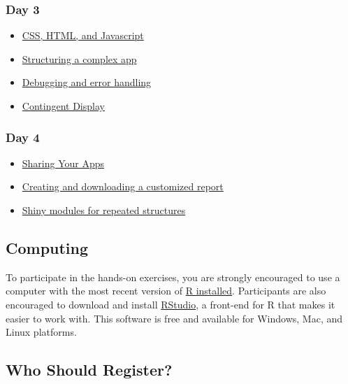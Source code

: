\documentclass[
  oneside]{book}
\providecommand{\tightlist}{%
  \setlength{\itemsep}{0pt}\setlength{\parskip}{0pt}}
\begin{document}
\hypertarget{day-3}{%
\subsubsection*{Day 3}\label{day-3}}

\begin{itemize}
\tightlist
\item
  \protect\hyperlink{web}{CSS, HTML, and Javascript}
\item
  \protect\hyperlink{structure}{Structuring a complex app}
\item
  \protect\hyperlink{debugging}{Debugging and error handling}
\item
  \protect\hyperlink{contingency}{Contingent Display}
\end{itemize}

\hypertarget{day-4}{%
\subsubsection*{Day 4}\label{day-4}}

\begin{itemize}
\tightlist
\item
  \protect\hyperlink{sharing}{Sharing Your Apps}
\item
  \protect\hyperlink{reports}{Creating and downloading a customized report}
\item
  \protect\hyperlink{modules}{Shiny modules for repeated structures}
\end{itemize}

\hypertarget{computing}{%
\subsection{Computing}\label{computing}}

To participate in the hands-on exercises, you are strongly encouraged to use a computer with the most recent version of \href{https://www.r-project.org/}{R installed}. Participants are also encouraged to download and install \href{https://www.rstudio.com/products/rstudio/download/}{RStudio}, a front-end for R that makes it easier to work with. This software is free and available for Windows, Mac, and Linux platforms.

\hypertarget{who-should-register}{%
\subsection{Who Should Register?}\label{who-should-register}}
\end{document}
